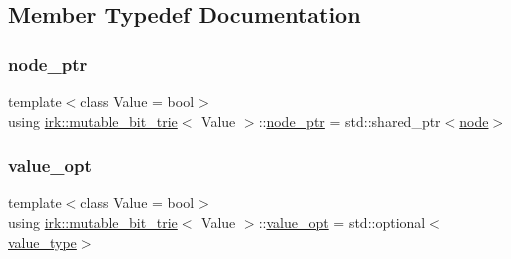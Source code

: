 \subsection{Member Typedef Documentation}
\mbox{\label{classirk_1_1mutable__bit__trie_abd23179ac4f02a981d4f47b4c0652287}} 
\subsubsection{\texorpdfstring{node\+\_\+ptr}{node\_ptr}}
{\footnotesize\ttfamily template$<$class Value = bool$>$ \\
using \mbox{\hyperlink{classirk_1_1mutable__bit__trie}{irk\+::mutable\+\_\+bit\+\_\+trie}}$<$ Value $>$\+::\mbox{\hyperlink{classirk_1_1mutable__bit__trie_abd23179ac4f02a981d4f47b4c0652287}{node\+\_\+ptr}} =  std\+::shared\+\_\+ptr$<$\mbox{\hyperlink{structirk_1_1mutable__bit__trie_1_1node}{node}}$>$}

\mbox{\label{classirk_1_1mutable__bit__trie_a7a1b77766d10fe2d02bb2ce01983f153}} 
\subsubsection{\texorpdfstring{value\+\_\+opt}{value\_opt}}
{\footnotesize\ttfamily template$<$class Value = bool$>$ \\
using \mbox{\hyperlink{classirk_1_1mutable__bit__trie}{irk\+::mutable\+\_\+bit\+\_\+trie}}$<$ Value $>$\+::\mbox{\hyperlink{classirk_1_1mutable__bit__trie_a7a1b77766d10fe2d02bb2ce01983f153}{value\+\_\+opt}} =  std\+::optional$<$\mbox{\hyperlink{classirk_1_1mutable__bit__trie_a398f85c4065b746e6ab10842981a9bf4}{value\+\_\+type}}$>$}

\mbox{\label{classirk_1_1mutable__bit__trie_a398f85c4065b746e6ab10842981a9bf4}} 
